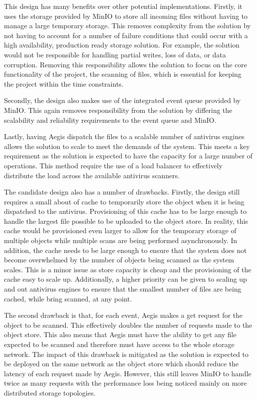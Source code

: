 \documentclass[12pt, conference, final, a4paper, onecolumn, compsoc]{IEEEtran}
\begin{document}
This design has many benefits over other potential implementations. Firstly, it
uses the storage provided by MinIO to store all incoming files without having to
manage a large temporary storage. This removes complexity from the
solution by not having to account for a number of failure conditions that could
occur with a high availability, production ready storage solution. For example,
the solution would not be responsible for handling partial writes, loss of data,
or data corruption. Removing this responsibility allows the solution to focus on
the core functionality of the project, the scanning of files, which is essential
for keeping the project within the time constraints.

Secondly, the design also makes use of the integrated event queue provided by
MinIO. This again removes responsibility from the solution by differing the
scalability and reliability requirements to the event queue and MinIO.

Lastly, having Aegis dispatch the files to a scalable number of antivirus
engines allows the solution to scale to meet the demands of the system. This
meets a key requirement as the solution is expected to have the capacity for a
large number of operations. This method require the use of a load balancer
to effectively distribute the load across the available antivirus scanners.

The candidate design also has a number of drawbacks. Firstly, the design still
requires a small about of cache to temporarily store the object when it is being
dispatched to the antivirus. Provisioning of this cache has to be large enough
to handle the largest file possible to be uploaded to the object store. In
reality, this cache would be provisioned even larger to allow for the temporary
storage of multiple objects while multiple scans are being performed
asynchronously. In addition, the cache needs to be large enough to ensure that
the system does not become overwhelmed by the number of objects being scanned as
the system scales. This is a minor issue as store capacity is cheap and the
provisioning of the cache easy to scale up. Additionally, a higher priority can
be given to scaling up and out antivirus engines to ensure that the smallest
number of files are being cached, while bring scanned, at any point.

The second drawback is that, for each event, Aegis makes a get request for the
object to be scanned. This effectively doubles the number of requests made to
the object store. This also means that Aegis must have the ability to get any
file expected to be scanned and therefore must have access to the whole storage
network. The impact of this drawback is mitigated as the solution is expected to
be deployed on the same network as the object store which should reduce the
latency of each request made by Aegis. However, this still leaves MinIO to
handle twice as many requests with the performance loss being noticed mainly on
more distributed storage topologies.
\end{document}
